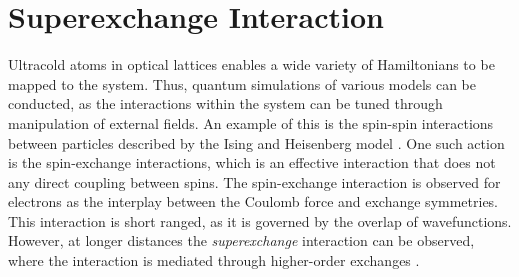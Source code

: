 \chapter{Superexchange Interaction}
Ultracold atoms in optical lattices enables a wide variety of Hamiltonians to be mapped to the system. Thus, quantum simulations of various models can be conducted, as the interactions within the system can be tuned through manipulation of external fields. An example of this is the spin-spin interactions between particles described by the Ising and Heisenberg model \cite{Bloch2012}. One such action is the spin-exchange interactions, which is an effective interaction that does not any direct coupling between spins. The spin-exchange interaction is observed for electrons as the interplay between the Coulomb force and exchange symmetries. This interaction is short ranged, as it is governed by the overlap of wavefunctions. However, at longer distances  the \textit{superexchange} interaction can be observed, where the interaction is mediated through higher-order exchanges \cite{Anderson1959}.

